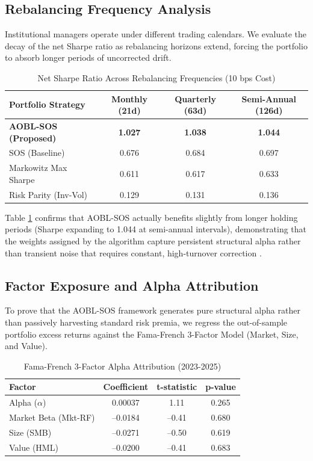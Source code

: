 \documentclass[11pt,a4paper]{article}
\begin{document}
\subsection{Rebalancing Frequency Analysis}
Institutional managers operate under different trading calendars. We evaluate the decay of the net Sharpe ratio as rebalancing horizons extend, forcing the portfolio to absorb longer periods of uncorrected drift.

\begin{table}[htbp]
\centering
\caption{Net Sharpe Ratio Across Rebalancing Frequencies (10 bps Cost)}
\label{tab:rebal_sensitivity}
\begin{tabular}{lccc}
\toprule
\textbf{Portfolio Strategy} & \textbf{Monthly (21d)} & \textbf{Quarterly (63d)} & \textbf{Semi-Annual (126d)} \\
\midrule
\textbf{AOBL-SOS (Proposed)} & \textbf{1.027} & \textbf{1.038} & \textbf{1.044} \\
SOS (Baseline) & 0.676 & 0.684 & 0.697 \\
Markowitz Max Sharpe & 0.611 & 0.617 & 0.633 \\
Risk Parity (Inv-Vol) & 0.129 & 0.131 & 0.136 \\
\bottomrule
\end{tabular}
\end{table}

Table \ref{tab:rebal_sensitivity} confirms that AOBL-SOS actually benefits slightly from longer holding periods (Sharpe expanding to 1.044 at semi-annual intervals), demonstrating that the weights assigned by the algorithm capture persistent structural alpha rather than transient noise that requires constant, high-turnover correction \cite{grinold1999}.

\subsection{Factor Exposure and Alpha Attribution}
To prove that the AOBL-SOS framework generates pure structural alpha rather than passively harvesting standard risk premia, we regress the out-of-sample portfolio excess returns against the Fama-French 3-Factor Model (Market, Size, and Value).

\begin{table}[htbp]
\centering
\caption{Fama-French 3-Factor Alpha Attribution (2023-2025)}
\label{tab:factor_attribution}
\begin{tabular}{lccc}
\toprule
\textbf{Factor} & \textbf{Coefficient} & \textbf{t-statistic} & \textbf{p-value} \\
\midrule
Alpha ($\alpha$) & 0.00037 & 1.11 & 0.265 \\
Market Beta (Mkt-RF) & --0.0184 & --0.41 & 0.680 \\
Size (SMB) & --0.0271 & --0.50 & 0.619 \\
Value (HML) & --0.0200 & --0.41 & 0.683 \\
\bottomrule
\end{tabular}
\end{table}
\end{document}
